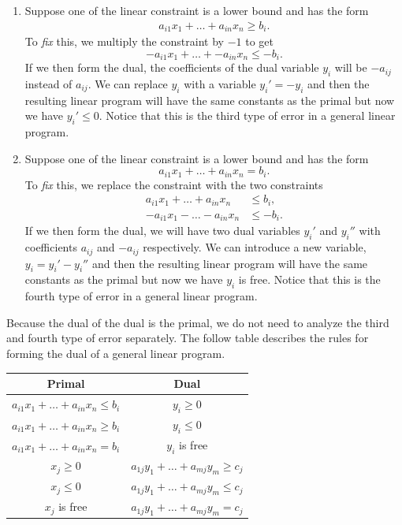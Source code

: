 \documentclass[
]{book}
\theoremstyle{definition}
\theoremstyle{definition}
\theoremstyle{definition}
\theoremstyle{definition}
\theoremstyle{remark}
\begin{document}
\begin{enumerate}
\def\labelenumi{\arabic{enumi}.}
\item
  Suppose one of the linear constraint is a lower bound and has the form
  \begin{align*}
   a_{i1} x_1 + \dots + a_{in} x_n \geq b_i.
    \end{align*}
  To \emph{fix} this, we multiply the constraint by \(-1\) to get \[-a_{i1} x_1 + \dots + - a_{in} x_n \leq -b_i.\]
  If we then form the dual, the coefficients of the dual variable \(y_i\) will be \(-a_{ij}\) instead of \(a_{ij}\).
  We can replace \(y_i\) with a variable \(y_i' = -y_i\) and then the resulting linear program will have the same constants as the primal but now we have \(y_i' \le 0\).
  Notice that this is the third type of error in a general linear program.
\item
  Suppose one of the linear constraint is a lower bound and has the form \[a_{i1} x_1 + \dots + a_{in} x_n = b_i.\]
  To \emph{fix} this, we replace the constraint with the two constraints
  \begin{align*}
   a_{i1} x_1 + \dots + a_{in} x_n &\leq b_i, \\
   -a_{i1} x_1 - \dots - a_{in} x_n &\leq -b_i.
    \end{align*}
  If we then form the dual, we will have two dual variables \(y_i'\) and \(y_i''\) with coefficients \(a_{ij}\) and \(-a_{ij}\) respectively.
  We can introduce a new variable, \(y_i = y_i' - y_i''\) and then the resulting linear program will have the same constants as the primal but now we have \(y_i\) is free.
  Notice that this is the fourth type of error in a general linear program.
\end{enumerate}

Because the dual of the dual is the primal, we do not need to analyze the third and fourth type of error separately.
The follow table describes the rules for forming the dual of a general linear program.

\begin{longtable}[]{@{}cc@{}}
\toprule()
Primal & Dual \\
\midrule()
\endhead
\(a_{i1} x_1 + \dots + a_{in} x_n \le b_i\) & \(y_i \ge 0\) \\
\(a_{i1} x_1 + \dots + a_{in} x_n \ge b_i\) & \(y_i \le 0\) \\
\(a_{i1} x_1 + \dots + a_{in} x_n = b_i\) & \(y_i\) is free \\
\(x_j \ge 0\) & \(a_{1j}y_1 + \dots + a_{mj} y_m \ge c_j\) \\
\(x_j \le 0\) & \(a_{1j}y_1 + \dots + a_{mj} y_m \le c_j\) \\
\(x_j\) is free & \(a_{1j}y_1 + \dots + a_{mj} y_m = c_j\) \\
\bottomrule()
\end{longtable}
\end{document}

